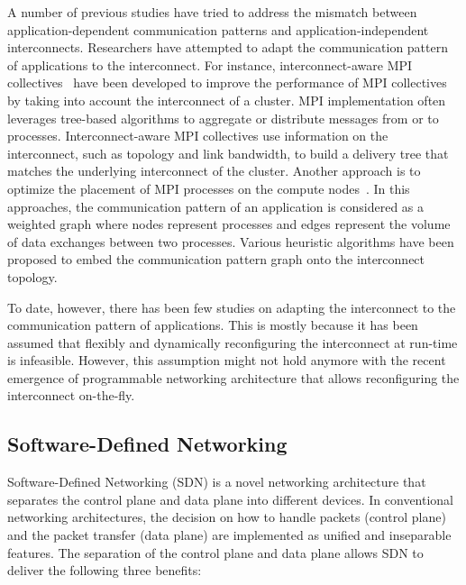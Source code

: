 A  number of previous studies have tried to address the mismatch between
application-dependent communication patterns and application-independent
interconnects. Researchers have attempted to adapt the communication
pattern of applications to the interconnect. For instance, interconnect-aware
MPI collectives~\autocite{Kumar2016,Kumar2014,Gong2015,Adachi2013} have been
developed to improve the performance of MPI collectives by taking into account
the interconnect of a cluster. MPI implementation often leverages tree-based
algorithms to aggregate or distribute messages from or to processes.
Interconnect-aware MPI collectives use information on the interconnect, such
as topology and link bandwidth, to build a delivery tree that matches the
underlying interconnect of the cluster. Another approach is to optimize the
placement of MPI processes on the compute
nodes~\autocite{Michelogiannakis2017,Hoefler2011,Choi2017}. In this
approaches, the communication pattern of an application is considered as a
weighted graph where nodes represent processes and edges represent the volume
of data exchanges between two processes. Various heuristic algorithms have
been proposed to embed the communication pattern graph onto the interconnect
topology.

To date, however, there has been few studies on adapting the
interconnect to the communication pattern of applications. This is mostly
because it has been assumed that flexibly and dynamically reconfiguring the
interconnect at run-time is infeasible. However, this assumption might not hold
anymore with the recent emergence of programmable networking architecture that
allows reconfiguring the interconnect on-the-fly.

\subsection{Software-Defined Networking}\label{sec:i-sdn}

Software-Defined Networking (SDN) is a novel networking architecture
that separates the control plane and data plane into different devices.
In conventional networking architectures, the decision on how to handle
packets (control plane) and the packet transfer (data plane) are
implemented as unified and inseparable features. The separation of the
control plane and data plane allows SDN to deliver the following three
benefits:

